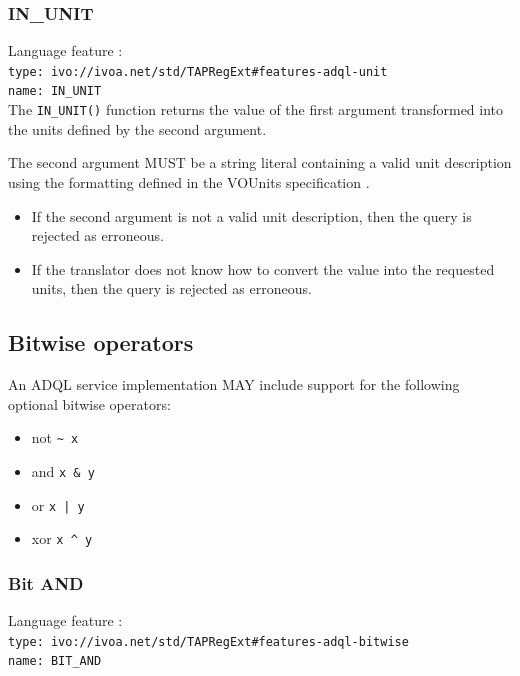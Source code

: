 \documentclass[11pt,a4paper]{ivoa}
\begin{document}
\subsubsection{IN\_UNIT}
\label{sec:unit.cast}
{\footnotesize Language feature :}\\
{\footnotesize \verb|type: ivo://ivoa.net/std/TAPRegExt#features-adql-unit|}\\
{\footnotesize \verb|name: IN_UNIT|}\\

The \verb:IN_UNIT(): function returns the value of the first argument
transformed into the units defined by the second argument.

The second argument MUST be a string literal containing a valid unit
description using the formatting defined in the VOUnits specification \citep{std:VOUNIT}.

\begin{itemize}
    \item If the second argument is not a valid unit description, then the query is rejected as erroneous. 
    \item If the translator does not know how to convert the value into the requested units, then the query is rejected as erroneous.
\end{itemize}

\subsection{Bitwise operators}
\label{sec:bitwise}

An ADQL service implementation MAY include support for the following optional
bitwise operators:

\begin{itemize}
    \item not \verb:~ x:
    \item and \verb:x & y: 
    \item or  \verb:x | y:
    \item xor \verb:x ^ y:
\end{itemize}

\subsubsection{Bit AND}
\label{sec:bitwise.and}
{\footnotesize Language feature :}\\
{\footnotesize \verb|type: ivo://ivoa.net/std/TAPRegExt#features-adql-bitwise|}\\
{\footnotesize \verb|name: BIT_AND|}\\
\end{document}
